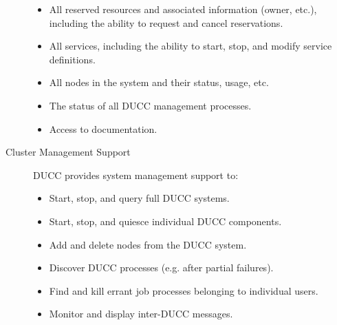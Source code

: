 \begin{description}
\begin{itemize}
              \item All reserved resources and associated information (owner, etc.),
                including the ability to request and cancel reservations.
                
              \item All services, including the ability to start, stop, and modify
                service definitions.
                
              \item All nodes in the system and their status, usage, etc. 
                                
              \item The status of all DUCC management processes.  

              \item Access to documentation.
          \end{itemize}


        \item[Cluster Management Support] DUCC provides system management support to:
          \begin{itemize}
              \item Start, stop, and query full DUCC systems.
 
              \item Start, stop, and quiesce individual DUCC components.
 
              \item Add and delete nodes from the DUCC system.
 
              \item Discover DUCC processes (e.g. after partial failures).
 
              \item Find and kill errant job processes belonging to individual users.
                
              \item Monitor and display inter-DUCC messages.
          \end{itemize}
      \end{description}

